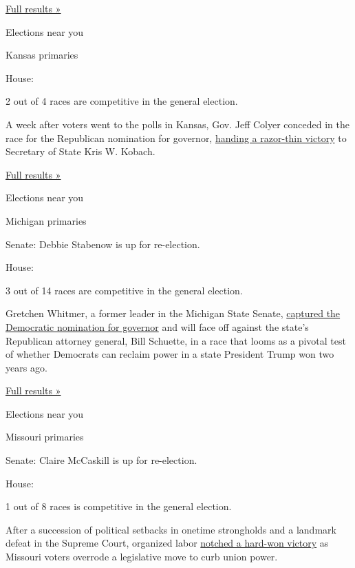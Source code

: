 \href{https://www.nytimes3xbfgragh.onion/interactive/2018/08/07/us/elections/results-ohio-special-house-election-district-12.html}{Full
results »}

Elections near you

Kansas primaries

House:

2 out of 4 races are competitive in the general election.

A week after voters went to the polls in Kansas, Gov. Jeff Colyer
conceded in the race for the Republican nomination for governor,
\href{https://www.nytimes3xbfgragh.onion/2018/08/14/us/politics/kansas-kobach-colyer.html}{handing
a razor-thin victory} to Secretary of State Kris W. Kobach.

\href{https://www.nytimes3xbfgragh.onion/interactive/2018/08/07/us/elections/results-kansas-primary-elections.html}{Full
results »}

Elections near you

Michigan primaries

Senate: Debbie Stabenow is up for re-election.

House:

3 out of 14 races are competitive in the general election.

Gretchen Whitmer, a former leader in the Michigan State Senate,
\href{https://www.nytimes3xbfgragh.onion/2018/08/07/us/politics/gretchen-whitmer-michigan-election-results.html}{captured
the Democratic nomination for governor} and will face off against the
state's Republican attorney general, Bill Schuette, in a race that looms
as a pivotal test of whether Democrats can reclaim power in a state
President Trump won two years ago.

\href{https://www.nytimes3xbfgragh.onion/interactive/2018/08/07/us/elections/results-michigan-primary-elections.html}{Full
results »}

Elections near you

Missouri primaries

Senate: Claire McCaskill is up for re-election.

House:

1 out of 8 races is competitive in the general election.

After a succession of political setbacks in onetime strongholds and a
landmark defeat in the Supreme Court, organized labor
\href{https://www.nytimes3xbfgragh.onion/2018/08/07/business/economy/missouri-labor-right-to-work.html}{notched
a hard-won victory} as Missouri voters overrode a legislative move to
curb union power.

